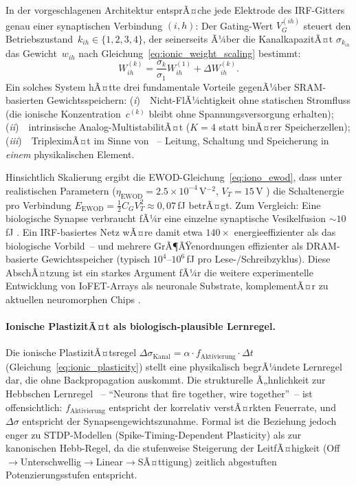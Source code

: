 ﻿\documentclass[12pt, a4paper, openany]{report}
\begin{document}
In der vorgeschlagenen Architektur entsprÃ¤che jede Elektrode des
IRF-Gitters genau einer synaptischen Verbindung $(i, h)$: Der Gating-Wert
$V_G^{(ih)}$ steuert den Betriebszustand~$k_{ih} \in \{1,2,3,4\}$, der
seinerseits Ã¼ber die KanalkapazitÃ¤t $\sigma_{k_{ih}}$ das Gewicht~$w_{ih}$
nach Gleichung~\ref{eq:ionic_weight_scaling} bestimmt:
\begin{equation}
  W^{(k)}_{ih} = \frac{\sigma_{k}}{\sigma_1} W^{(1)}_{ih} + \Delta W^{(k)}_{ih}.
  \label{eq:outlook_weight_irf}
\end{equation}
Ein solches System hÃ¤tte drei fundamentale Vorteile gegenÃ¼ber
SRAM-basierten Gewichtsspeichern: (\emph{i})~~Nicht-FlÃ¼chtigkeit ohne
statischen Stromfluss (die ionische Konzentration~$c^{(k)}$ bleibt ohne
Spannungsversorgung erhalten); (\emph{ii})~~intrinsische Analog-MultistabilitÃ¤t
($K=4$ statt binÃ¤rer Speicherzellen); (\emph{iii})~~TripleximÃ¤t im Sinne von
\citeauthor{epp2026iono}~-- Leitung, Schaltung und Speicherung in \textit{einem}
physikalischen Element.

Hinsichtlich Skalierung ergibt die EWOD-Gleichung~\ref{eq:iono_ewod}, dass
unter realistischen Parametern ($\eta_{\text{EWOD}} = 2.5\times10^{-4}$\,V$^{-2}$,
$V_T = 15$\,V \cite{epp2026iono}) die Schaltenergie pro Verbindung
$E_{\text{EWOD}} = \frac{1}{2} C_G V_T^2 \approx 0{,}07$\,fJ betrÃ¤gt.
Zum Vergleich: Eine biologische Synapse verbraucht fÃ¼r eine einzelne
synaptische Vesikelfusion $\sim\!10$\,fJ \cite{laughlin03}.  Ein IRF-basiertes
Netz wÃ¤re damit etwa $140\times$ energieeffizienter als das
biologische Vorbild~-- und mehrere GrÃ¶ÃŸenordnungen effizienter als
DRAM-basierte Gewichtsspeicher (typisch $10^4$--$10^6$\,fJ pro
Lese-/Schreibzyklus).  Diese AbschÃ¤tzung ist ein starkes Argument fÃ¼r die
weitere experimentelle Ent\-wick\-lung von IoFET-Arrays als neuronale Substrate,
komplementÃ¤r zu aktuellen neuromorphen Chips \cite{schuman17}.

\paragraph{Ionische PlastizitÃ¤t als biologisch-plausible Lernregel.}
Die ionische PlastizitÃ¤tsregel
$\Delta\sigma_{\text{Kanal}} = \alpha \cdot f_{\text{Aktivierung}} \cdot \Delta t$
(Gleichung~\ref{eq:ionic_plasticity}) stellt eine physikalisch begrÃ¼ndete
Lernregel dar, die ohne Backpropagation auskommt.  Die strukturelle Ã„hnlichkeit
zur Hebbschen Lernregel \cite{hebb49}~-- ``Neurons that fire together, wire
together''~-- ist offensichtlich: $f_{\text{Aktivierung}}$ entspricht der
korrelativ verstÃ¤rkten Feuerrate, und $\Delta\sigma$ entspricht der
Synapsengewichts\-zunahme.  Formal ist die Beziehung jedoch enger zu
STDP-Modellen (Spike-Timing-Dependent Plasticity) als zur kanonischen
Hebb-Regel, da die stufenweise Steigerung der LeitfÃ¤higkeit (Off$\to$Unterschwellig$\to$Linear$\to$SÃ¤ttigung) zeitlich
abgestuften Potenzierungsstufen entspricht.
\end{document}

